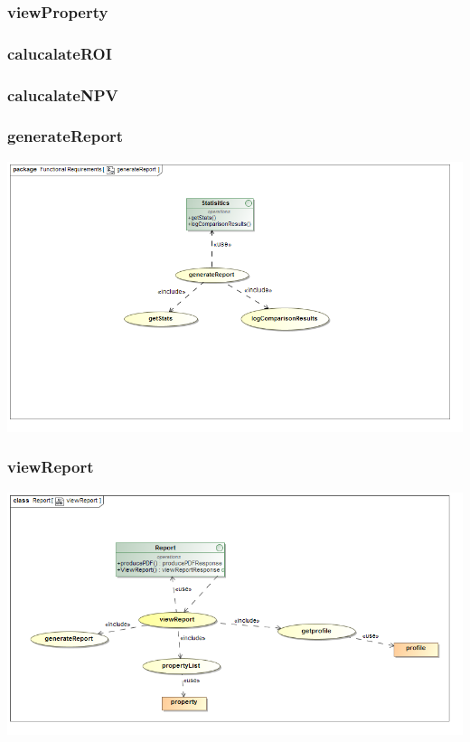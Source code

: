 \documentclass[a4paper,12pt]{article}
\begin{document}
\subsubsection{viewProperty}

\subsubsection{calucalateROI}
\subsubsection{calucalateNPV}

\subsubsection{generateReport}
\includegraphics[width=1\textwidth]{./Images/requiredFunctionality/generateReport.png}
\subsubsection{viewReport}
\includegraphics[width=1\textwidth]{./Images/newDiagrams/requiredFunctionality/Sandile/viewReportFR.png}
\end{document}
